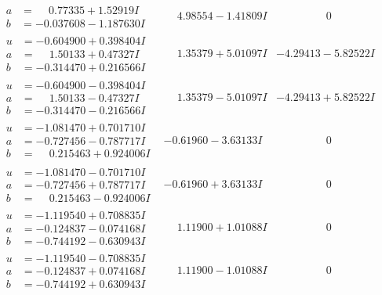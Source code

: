\documentclass[1p]{elsarticle_modified}
\theoremstyle{definition}
\begin{document}
$$\begin{array}{c|c|c}
\begin{aligned}
a &= \phantom{-}0.77335 + 1.52919 I \\
b &= -0.037608 - 1.187630 I\end{aligned}
 & \phantom{-}4.98554 - 1.41809 I & \phantom{-0.000000 } 0 \\ \hline\begin{aligned}
u &= -0.604900 + 0.398404 I \\
a &= \phantom{-}1.50133 + 0.47327 I \\
b &= -0.314470 + 0.216566 I\end{aligned}
 & \phantom{-}1.35379 + 5.01097 I & -4.29413 - 5.82522 I \\ \hline\begin{aligned}
u &= -0.604900 - 0.398404 I \\
a &= \phantom{-}1.50133 - 0.47327 I \\
b &= -0.314470 - 0.216566 I\end{aligned}
 & \phantom{-}1.35379 - 5.01097 I & -4.29413 + 5.82522 I \\ \hline\begin{aligned}
u &= -1.081470 + 0.701710 I \\
a &= -0.727456 - 0.787717 I \\
b &= \phantom{-}0.215463 + 0.924006 I\end{aligned}
 & -0.61960 - 3.63133 I & \phantom{-0.000000 } 0 \\ \hline\begin{aligned}
u &= -1.081470 - 0.701710 I \\
a &= -0.727456 + 0.787717 I \\
b &= \phantom{-}0.215463 - 0.924006 I\end{aligned}
 & -0.61960 + 3.63133 I & \phantom{-0.000000 } 0 \\ \hline\begin{aligned}
u &= -1.119540 + 0.708835 I \\
a &= -0.124837 - 0.074168 I \\
b &= -0.744192 - 0.630943 I\end{aligned}
 & \phantom{-}1.11900 + 1.01088 I & \phantom{-0.000000 } 0 \\ \hline\begin{aligned}
u &= -1.119540 - 0.708835 I \\
a &= -0.124837 + 0.074168 I \\
b &= -0.744192 + 0.630943 I\end{aligned}
 & \phantom{-}1.11900 - 1.01088 I & \phantom{-0.000000 } 0 \\ \hline\begin{aligned}

\end{aligned}
\end{array}$$
\end{document}
